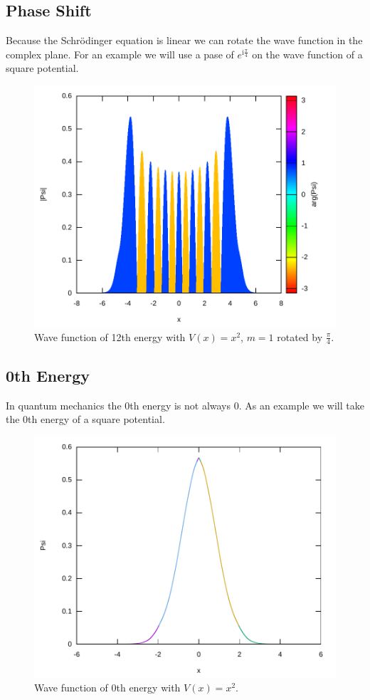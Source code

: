 \documentclass[11pt,DIV=10,final]{scrreprt} %
\newcommand{\mi}{{\text{i}}}
\begin{document}
\subsection{Phase Shift}
Because the Schrödinger equation is linear we can rotate the wave function in the complex plane. For an example we will use a pase of $e^{\mi \frac{\pi}{4}}$ on the wave function of a square potential.
\begin{figure}[H]
  \centering
  \includegraphics[width=\textwidth]{plots/square-12-pi4.pdf}
  \caption{Wave function of 12th energy with $V(x) = x^{2}$, $m = 1$ rotated by $\frac{\pi}{4}$.}
\end{figure}

\subsection{0th Energy}
\begin{minipage}{\textwidth}
In quantum mechanics the 0th energy is not always 0. As an example we will take the 0th
energy of a square potential.
\begin{figure}[H]
  \centering
  \includegraphics[width=\textwidth]{plots/square-0.pdf}
  \caption{Wave function of 0th energy with $V(x) = x^{2}$.}
\end{figure}
\end{minipage}
\end{document}
